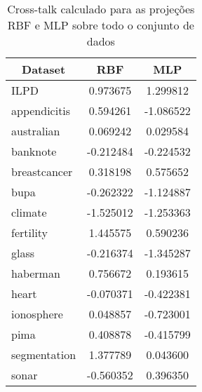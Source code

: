 \documentclass[conference]{IEEEtran}
\begin{document}
	\begin{table}[h!]
		\centering
		\label{tab:crosstalk}
		\caption{Cross-talk calculado para as projeções RBF e MLP sobre todo o conjunto de dados}
		\begin{tabular}{|l|c|c|}
			\hline
			\multicolumn{1}{|c|}{\textbf{Dataset}} & \textbf{RBF} & \textbf{MLP} \\ \hline
			ILPD                                   & 0.973675     & 1.299812     \\ \hline
			appendicitis                           & 0.594261     & -1.086522    \\ \hline
			australian                             & 0.069242     & 0.029584     \\ \hline
			banknote                               & -0.212484    & -0.224532    \\ \hline
			breastcancer                           & 0.318198     & 0.575652     \\ \hline
			bupa                                   & -0.262322    & -1.124887    \\ \hline
			climate                                & -1.525012    & -1.253363    \\ \hline
			fertility                              & 1.445575     & 0.590236     \\ \hline
			glass                                  & -0.216374    & -1.345287    \\ \hline
			haberman                               & 0.756672     & 0.193615     \\ \hline
			heart                                  & -0.070371    & -0.422381    \\ \hline
			ionosphere                             & 0.048857     & -0.723001    \\ \hline
			pima                                   & 0.408878     & -0.415799    \\ \hline
			segmentation                           & 1.377789     & 0.043600     \\ \hline
			sonar                                  & -0.560352    & 0.396350     \\ \hline
		\end{tabular}
	\end{table}
\end{document}
